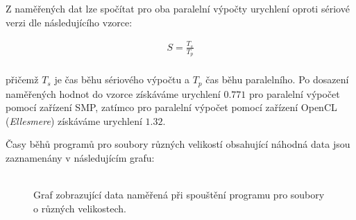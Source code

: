 \documentclass[12pt, a4paper]{article}
\begin{document}
Z naměřených dat lze spočítat pro oba paralelní výpočty urychlení oproti sériové verzi dle následujícího vzorce:

\begin{equation}
    \begin{split}
    S = \frac{T_s}{T_p} \\ 
    \end{split}
\end{equation}

přičemž $T_s$ je čas běhu sériového výpočtu a $T_p$ čas běhu paralelního. 
Po dosazení naměřených hodnot do vzorce získáváme urychlení $0.771$ pro paralelní výpočet pomocí zařízení SMP, zatímco pro paralelní výpočet pomocí zařízení OpenCL (\textit{Ellesmere}) získáváme urychlení $1.32.$

Časy běhů programů pro soubory různých velikostí obsahující náhodná data jsou zaznamenány v následujícím grafu:
\\
\\
\begin{figure}[!ht]
    \centering
    \caption{Graf zobrazující data naměřená při spouštění programu pro soubory o různých velikostech.}
\end{figure}
\end{document}
